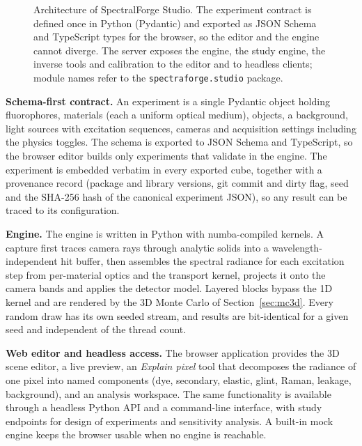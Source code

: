 \documentclass[journal]{IEEEtran}
\begin{document}
\begin{figure}[!t]
{}
\caption{Architecture of SpectralForge Studio. The experiment contract is defined once in Python (Pydantic) and exported as JSON Schema and TypeScript types for the browser, so the editor and the engine cannot diverge. The server exposes the engine, the study engine, the inverse tools and calibration to the editor and to headless clients; module names refer to the \texttt{spectraforge.studio} package.}
\label{fig:arch}
\end{figure}

\textbf{Schema-first contract.} An experiment is a single Pydantic object holding fluorophores, materials (each a uniform optical medium), objects, a background, light sources with excitation sequences, cameras and acquisition settings including the physics toggles. The schema is exported to JSON Schema and TypeScript, so the browser editor builds only experiments that validate in the engine. The experiment is embedded verbatim in every exported cube, together with a provenance record (package and library versions, git commit and dirty flag, seed and the SHA-256 hash of the canonical experiment JSON), so any result can be traced to its configuration.

\textbf{Engine.} The engine is written in Python with numba-compiled kernels. A capture first traces camera rays through analytic solids into a wavelength-independent hit buffer, then assembles the spectral radiance for each excitation step from per-material optics and the transport kernel, projects it onto the camera bands and applies the detector model. Layered blocks bypass the 1D kernel and are rendered by the 3D Monte Carlo of Section~\ref{sec:mc3d}. Every random draw has its own seeded stream, and results are bit-identical for a given seed and independent of the thread count.

\textbf{Web editor and headless access.} The browser application provides the 3D scene editor, a live preview, an \emph{Explain pixel} tool that decomposes the radiance of one pixel into named components (dye, secondary, elastic, glint, Raman, leakage, background), and an analysis workspace. The same functionality is available through a headless Python API and a command-line interface, with study endpoints for design of experiments and sensitivity analysis. A built-in mock engine keeps the browser usable when no engine is reachable.
\end{document}
